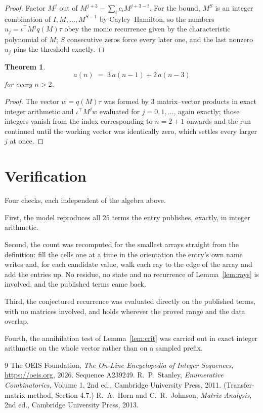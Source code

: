 \documentclass[11pt,a4paper]{article}
\theoremstyle{plain}
\newtheorem{theorem}{Theorem}
\theoremstyle{definition}
\begin{document}
\begin{proof}
Factor $M^{j}$ out of $M^{j+3}-\sum_ic_iM^{j+3-i}$. For the bound, $M^{S}$
is an integer combination of $I,M,\dots,M^{S-1}$ by Cayley--Hamilton, so the numbers
$u_j=\iota^{\!\top}M^{j}q(M)\tau$ obey the monic recurrence given by the characteristic
polynomial of $M$; $S$ consecutive zeros force every later one, and the last nonzero $u_j$
pins the threshold exactly.
\end{proof}

\begin{theorem}
\[
a(n)\;=\;3\,a(n-1) + 2\,a(n-3)
\]
for every $n>2$.
\end{theorem}

\begin{proof}
The vector $w=q(M)\tau$ was formed by $3$ matrix--vector products in exact integer
arithmetic and $\iota^{\!\top}M^{j}w$ evaluated for $j=0,1,\dots$, again exactly; those
integers vanish from the index corresponding to $n=2+1$ onwards and the run continued
until the working vector was identically zero, which settles every larger $j$ at once.
\end{proof}

\section{Verification}

Four checks, each independent of the algebra above.

First, the model reproduces all $25$ terms the entry publishes, exactly, in integer
arithmetic.

Second, the count was recomputed for the smallest arrays straight from the definition: fill the
cells one at a time in the orientation the entry's own name writes and, for each candidate
value, walk each ray to the edge of the array and add the entries up. No residue, no state and
no recurrence of Lemma~\ref{lem:rays} is involved, and the published terms came back.

Third, the conjectured recurrence was evaluated directly on the published terms, with no
matrices involved, and holds wherever the proved range and the data overlap.

Fourth, the annihilation test of Lemma~\ref{lem:crit} was carried out in exact integer
arithmetic on the whole vector rather than on a sampled prefix.

\begin{thebibliography}{9}
 The OEIS Foundation, \emph{The On-Line Encyclopedia of Integer
Sequences}, \url{https://oeis.org}, 2026. Sequence A239249.
 R.~P.~Stanley, \emph{Enumerative Combinatorics}, Volume 1, 2nd ed.,
Cambridge University Press, 2011. (Transfer-matrix method, Section 4.7.)
 R.~A.~Horn and C.~R.~Johnson, \emph{Matrix Analysis}, 2nd ed., Cambridge
University Press, 2013.
\end{thebibliography}
\end{document}
